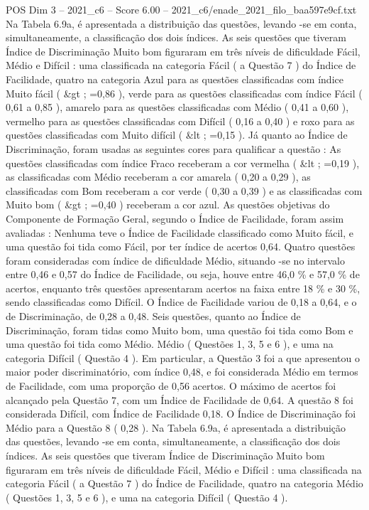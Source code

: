 \begin{textsample}{POS Dim 3 – 2021\_c6 – Score 6.00 – 2021\_c6/enade\_2021\_filo\_baa597e9cf.txt}
Na Tabela 6.9a, é apresentada a distribuição das questões, levando -se em conta, simultaneamente, a classificação dos dois índices.
As seis questões que tiveram Índice de Discriminação Muito bom figuraram em três níveis de dificuldade Fácil, Médio e Difícil : uma classificada na categoria Fácil ( a Questão 7 ) do Índice de Facilidade, quatro na categoria Azul para as questões classificadas com índice Muito fácil ( \&gt ; =0,86 ), verde para as questões classificadas com índice Fácil ( 0,61 a 0,85 ), amarelo para as questões classificadas com Médio ( 0,41 a 0,60 ), vermelho para as questões classificadas com Difícil ( 0,16 a 0,40 ) e roxo para as questões classificadas com Muito difícil ( \&lt ; =0,15 ).
Já quanto ao Índice de Discriminação, foram usadas as seguintes cores para qualificar a questão : As questões classificadas com índice Fraco receberam a cor vermelha ( \&lt ; =0,19 ), as classificadas com Médio receberam a cor amarela ( 0,20 a 0,29 ), as classificadas com Bom receberam a cor verde ( 0,30 a 0,39 ) e as classificadas com Muito bom ( \&gt ; =0,40 ) receberam a cor azul.
As questões objetivas do Componente de Formação Geral, segundo o Índice de Facilidade, foram assim avaliadas : Nenhuma teve o Índice de Facilidade classificado como Muito fácil, e uma questão foi tida como Fácil, por ter índice de acertos 0,64.
Quatro questões foram consideradas com índice de dificuldade Médio, situando -se no intervalo entre 0,46 e 0,57 do Índice de Facilidade, ou seja, houve entre 46,0 \% e 57,0 \% de acertos, enquanto três questões apresentaram acertos na faixa entre 18 \% e 30 \%, sendo classificadas como Difícil.
O Índice de Facilidade variou de 0,18 a 0,64, e o de Discriminação, de 0,28 a 0,48.
Seis questões, quanto ao Índice de Discriminação, foram tidas como Muito bom, uma questão foi tida como Bom e uma questão foi tida como Médio.
Médio ( Questões 1, 3, 5 e 6 ), e uma na categoria Difícil ( Questão 4 ).
Em particular, a Questão 3 foi a que apresentou o maior poder discriminatório, com índice 0,48, e foi considerada Médio em termos de Facilidade, com uma proporção de 0,56 acertos.
O máximo de acertos foi alcançado pela Questão 7, com um Índice de Facilidade de 0,64.
A questão 8 foi considerada Difícil, com Índice de Facilidade 0,18.
O Índice de Discriminação foi Médio para a Questão 8 ( 0,28 ).
Na Tabela 6.9a, é apresentada a distribuição das questões, levando -se em conta, simultaneamente, a classificação dos dois índices.
As seis questões que tiveram Índice de Discriminação Muito bom figuraram em três níveis de dificuldade Fácil, Médio e Difícil : uma classificada na categoria Fácil ( a Questão 7 ) do Índice de Facilidade, quatro na categoria Médio ( Questões 1, 3, 5 e 6 ), e uma na categoria Difícil ( Questão 4 ).

\end{textsample}
